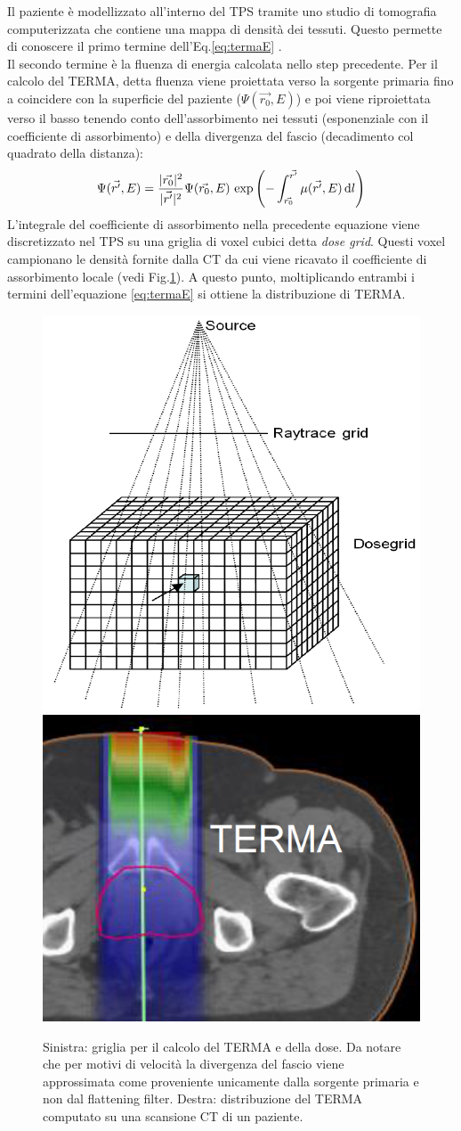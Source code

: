 {Il paziente è modellizzato all'interno del TPS tramite uno studio di tomografia computerizzata che contiene una mappa di densità dei tessuti. Questo permette di conoscere il primo termine dell'Eq.\eqref{eq:termaE} \cite{RaySearchLaboratories2014}.\\
Il secondo termine è la fluenza di energia calcolata nello step precedente. Per il calcolo del TERMA, detta fluenza viene proiettata verso la sorgente primaria fino a coincidere con la superficie del paziente ($\Psi(\vec{r_0},E)$) e poi viene riproiettata verso il basso tenendo conto dell'assorbimento nei tessuti (esponenziale con il coefficiente di assorbimento) e della divergenza del fascio (decadimento col quadrato della distanza):
\begin{equation}
\label{eq:fluence}
\Psi(\vec{r'},E) = \frac{|\vec{r_0}|^2}{|\vec{r'}|^2}\Psi(\vec{r_0},E)\,\exp{\left( -\int_{\vec{r_0}}^{\vec{r'}} \mu(\vec{r'},E) \,\text{d}l \right)}
\end{equation}
L'integrale del coefficiente di assorbimento nella precedente equazione viene discretizzato nel TPS su una griglia di voxel cubici detta \textit{dose grid}. Questi voxel campionano le densità fornite dalla CT da cui viene ricavato il coefficiente di assorbimento locale (vedi Fig.\ref{fig:terma}). A questo punto, moltiplicando entrambi i termini dell'equazione \eqref{eq:termaE} si ottiene la distribuzione di TERMA.

\begin{figure}
\centering
\includegraphics[width=.4\textwidth]{./cap1/terma_1.png}
\includegraphics[width=.5\textwidth]{./cap1/terma_2.png}
\caption{Sinistra: griglia per il calcolo del TERMA e della dose. Da notare che per motivi di velocità la divergenza del fascio viene approssimata come proveniente unicamente dalla sorgente primaria e non dal flattening filter. Destra: distribuzione del TERMA computato su una scansione CT di un paziente.}
\label{fig:terma}
\end{figure}

}
